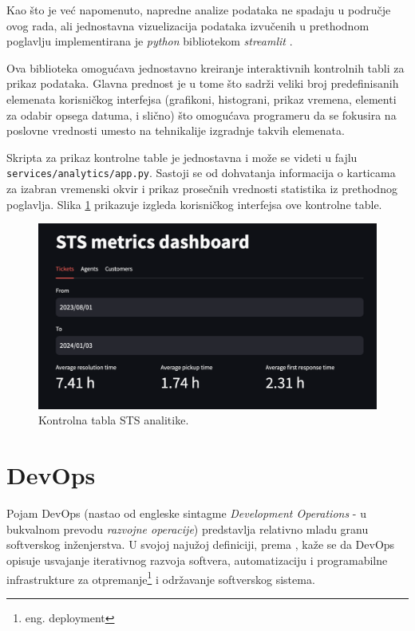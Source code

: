 \documentclass[12pt,oneside]{memoir}
\begin{document}
Kao što je već napomenuto, napredne analize podataka ne spadaju u područje ovog rada, ali jednostavna vizuelizacija podataka izvučenih u prethodnom poglavlju implementirana je \textit{python} bibliotekom \textit{streamlit} \cite{streamlitdocs}.

Ova biblioteka omogućava jednostavno kreiranje interaktivnih kontrolnih tabli za prikaz podataka. Glavna prednost je u tome što sadrži veliki broj predefinisanih elemenata korisničkog interfejsa (grafikoni, histograni, prikaz vremena, elementi za odabir opsega datuma, i slično) što omogućava programeru da se fokusira na poslovne vrednosti umesto na tehnikalije izgradnje takvih elemenata. 

Skripta za prikaz kontrolne table je jednostavna i može se videti u fajlu \verb|services/analytics/app.py|. Sastoji se od dohvatanja informacija o karticama za izabran vremenski okvir i prikaz prosečnih vrednosti statistika iz prethodnog poglavlja. Slika \ref{fig:stsmetrics} prikazuje izgleda korisničkog interfejsa ove kontrolne table.

\begin{figure}[h]
  \centering
  \includegraphics[width=1\textwidth]{docs/images/ch_5/stsmetrics.png} 
  \caption{Kontrolna tabla STS analitike.}
  \label{fig:stsmetrics}
\end{figure}


\chapter{DevOps}

Pojam DevOps (nastao od engleske sintagme \textit{Development Operations} - u bukvalnom prevodu \textit{razvojne operacije}) predstavlja relativno mladu granu softverskog inženjerstva. U svojoj najužoj definiciji, prema \cite{zdevopsarticle}, kaže se da DevOps opisuje usvajanje iterativnog razvoja softvera, automatizaciju i programabilne infrastrukture za otpremanje\footnote{eng. deployment} i održavanje softverskog sistema.
\end{document}
